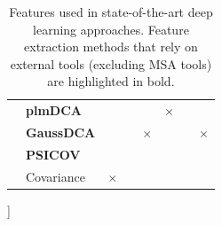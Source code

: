 \begin{landscape}
\begin{table}[H]
\begin{tabular}{llcccccc}
                    & \textbf{plmDCA} & & & & $\times$ & & \\
                    & \textbf{GaussDCA} & & & $\times$ & & & $\times$ \\
                    & \textbf{PSICOV} & & & & & & \\
                    & Covariance & $\times$ & & & & & \\
                    \hline
                \end{tabular}
                    \caption{Features used in state-of-the-art deep learning approaches.
                        Feature extraction methods that rely on external tools (excluding
                        MSA tools) are highlighted in bold.}
                    \label{features}
            \end{table} ]
        \end{landscape}